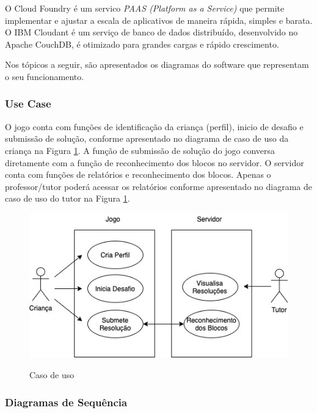     O Cloud Foundry é um servico \textit{PAAS (Platform as a Service)} que permite implementar e ajustar a escala de aplicativos de maneira rápida, simples e barata. O IBM Cloudant é um serviço de banco de dados distribuído, desenvolvido no Apache CouchDB, é otimizado para grandes cargas e rápido crescimento.
    
    Nos tópicos a seguir, são apresentados os diagramas do software que representam o seu funcionamento.
        
        \subsubsection{Use Case}
        O jogo conta com funções de identificação da criança (perfil), inicio de desafio e submissão de solução, conforme apresentado no diagrama de caso de uso da criança na Figura \ref{figura:use_case}. A função de submissão de solução do jogo conversa diretamente com a função de reconhecimento dos blocos no servidor.
        O servidor conta com funções de relatórios e reconhecimento dos blocos. Apenas o professor/tutor poderá acessar os relatórios conforme apresentado no diagrama de caso de uso do tutor na Figura \ref{figura:use_case}.
        
        \begin{figure}[H]
            \caption{Caso de uso}
            \centering
                \includegraphics[width=15cm]{Imagens/Cap3/Use_Case.jpg}
            \label{figura:use_case}
        \end{figure}
        
        \subsubsection{Diagramas de Sequência}
        

